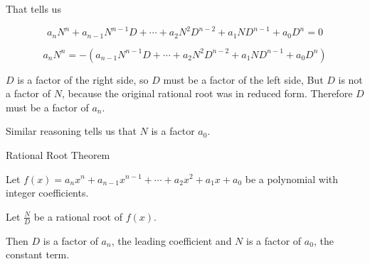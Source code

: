 \documentclass{ximera}
\begin{document}
That tells us

\[   a_n N^n + a_{n-1} N^{n-1} D + \cdots + a_2 N^2 D^{n-2}+ a_1 N D^{n-1} + a_0 D^n  = 0       \]



\[   a_n N^n  =   -(a_{n-1} N^{n-1} D + \cdots + a_2 N^2 D^{n-2}+ a_1 N D^{n-1} + a_0 D^n)      \]


$D$ is a factor of the right side, so $D$ must be a factor of the left side,  But $D$ is not a factor of $N$, because the original rational root was in reduced form.  Therefore $D$ must be a factor of $a_n$.

Similar reasoning tells us that $N$ is a factor  $a_0$.





\begin{theorem} Rational Root Theorem


Let $ f(x) = a_n x^n + a_{n-1} x^{n-1} + \cdots + a_2 x^2 + a_1 x + a_0 $ be a polynomial with integer coefficients.

Let $\frac{N}{D}$ be a rational root of $f(x)$.

Then $D$ is a factor of $a_n$, the leading coefficient and $N$ is a factor of $a_0$, the constant term.

\end{theorem}
\end{document}
